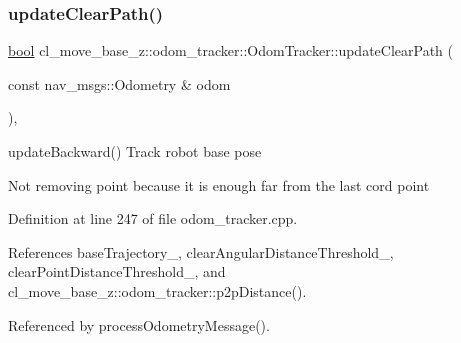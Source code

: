 \subsubsection{\texorpdfstring{update\+Clear\+Path()}{updateClearPath()}}
{\footnotesize\ttfamily \hyperlink{classbool}{bool} cl\+\_\+move\+\_\+base\+\_\+z\+::odom\+\_\+tracker\+::\+Odom\+Tracker\+::update\+Clear\+Path (\begin{DoxyParamCaption}\item[{const nav\+\_\+msgs\+::\+Odometry \&}]{odom }\end{DoxyParamCaption})\hspace{0.3cm}{\ttfamily [protected]}, {\ttfamily [virtual]}}

update\+Backward() Track robot base pose

Not removing point because it is enough far from the last cord point 

Definition at line 247 of file odom\+\_\+tracker.\+cpp.



References base\+Trajectory\+\_\+, clear\+Angular\+Distance\+Threshold\+\_\+, clear\+Point\+Distance\+Threshold\+\_\+, and cl\+\_\+move\+\_\+base\+\_\+z\+::odom\+\_\+tracker\+::p2p\+Distance().



Referenced by process\+Odometry\+Message().


